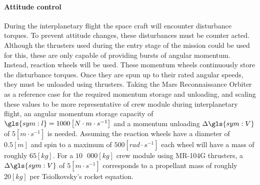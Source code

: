 \paragraph{Attitude control}
During the interplanetary flight the space craft will encounter disturbance torques. To prevent attitude changes, these disturbances must be counter acted. Although the thrusters used during the entry stage of the mission could be used for this, these are only capable of providing bursts of angular momentum. Instead, reaction wheels will be used. These momentum wheels continuously store the disturbance torques. Once they are spun up to their rated angular speeds, they must be unloaded using thrusters. Taking the Mars Reconnaissance Orbiter \cite{You2007} as a reference case for the required momentum storage and unloading, and scaling these values to be more representative of crew module during interplanetary flight, an angular momentum storage capacity of $\gls{sym:l} = 1000 \left[N \cdot m\cdot s^{-1}\right]$ and a momentum unloading $\Delta\gls{sym:V}$ of $5 \left[m\cdot s^{-1}\right]$ is needed. Assuming the reaction wheels have a diameter of $0.5 \left[m\right]$ and spin to a maximum of $500 \left[rad \cdot s^{-1}\right]$ each wheel will have a mass of roughly $65 \left[kg\right]$. For a $10\mbox{ }000 \left[kg\right]$ crew module using MR-104G thrusters, a $\Delta\gls{sym:V}$ of $5 \left[m\cdot s^{-1}\right]$ corresponds to a propellant mass of roughly $20 \left[kg\right]$ per Tsiolkovsky's rocket equation. 
